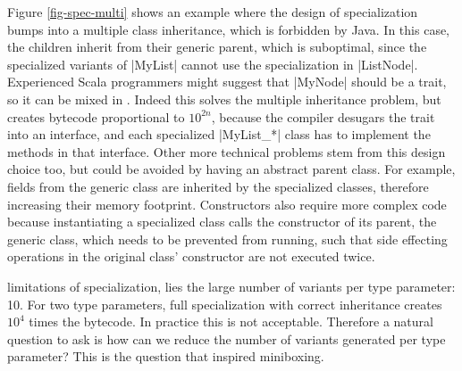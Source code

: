  Figure \ref{fig-spec-multi} shows an example where the design of specialization bumps into a multiple class inheritance, which is forbidden by Java. In this case, the children inherit from their generic parent, which is suboptimal, since the specialized variants of |MyList| cannot use the specialization in |ListNode|. Experienced Scala programmers might suggest that |MyNode| should be a trait, so it can be mixed in \cite{scalable-component-abstractions}. Indeed this solves the multiple inheritance problem, but creates bytecode proportional to $10^{2n}$, because the compiler desugars the trait into an interface, and each specialized |MyList_*| class has to implement the methods in that interface. Other more technical problems stem from this design choice too, but could be avoided by having an abstract parent class. For example, fields from the generic class are inherited by the specialized classes, therefore increasing their memory footprint. Constructors also require more complex code because instantiating a specialized class calls the constructor of its parent, the generic class, which needs to be prevented from running, such that side effecting operations in the original class' constructor are not executed twice.

 limitations of specialization, lies the large number of variants per type parameter: 10. For two type parameters, full specialization with correct inheritance creates $10^4$ times the bytecode. In practice this is not acceptable. Therefore a natural question to ask is how can we reduce the number of variants generated per type parameter? This is the question that inspired miniboxing.

